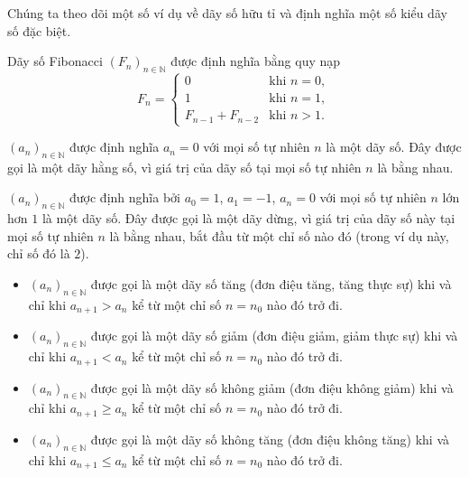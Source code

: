 Chúng ta theo dõi một số ví dụ về dãy số hữu tỉ và định nghĩa một số kiểu dãy số đặc biệt.
\begin{example}
    Dãy số Fibonacci ${(F_{n})}_{n\in\mathbb{N}}$ được định nghĩa bằng quy nạp
    \[
        F_{n} = \begin{cases}
            0                 & \text{khi $n = 0$}, \\
            1                 & \text{khi $n = 1$}, \\
            F_{n-1} + F_{n-2} & \text{khi $n > 1$}.
        \end{cases}
    \]
\end{example}

\begin{example}
    ${(a_{n})}_{n\in\mathbb{N}}$ được định nghĩa $a_{n} = 0$ với mọi số tự nhiên $n$ là một dãy số. Đây được gọi là một dãy hằng số, vì giá trị của dãy số tại mọi số tự nhiên $n$ là bằng nhau.
\end{example}

\begin{example}
    ${(a_{n})}_{n\in\mathbb{N}}$ được định nghĩa bởi $a_{0} = 1$, $a_{1} = -1$, $a_{n} = 0$ với mọi số tự nhiên $n$ lớn hơn $1$ là một dãy số. Đây được gọi là một dãy dừng, vì giá trị của dãy số này tại mọi số tự nhiên $n$ là bằng nhau, bắt đầu từ một chỉ số nào đó (trong ví dụ này, chỉ số đó là $2$).
\end{example}

\begin{example}
    \begin{itemize}
        \item ${(a_{n})}_{n\in\mathbb{N}}$ được gọi là một dãy số tăng (đơn điệu tăng, tăng thực sự) khi và chỉ khi $a_{n+1} > a_{n}$ kể từ một chỉ số $n = n_{0}$ nào đó trở đi.
        \item ${(a_{n})}_{n\in\mathbb{N}}$ được gọi là một dãy số giảm (đơn điệu giảm, giảm thực sự) khi và chỉ khi $a_{n+1} < a_{n}$ kể từ một chỉ số $n = n_{0}$ nào đó trở đi.
        \item ${(a_{n})}_{n\in\mathbb{N}}$ được gọi là một dãy số không giảm (đơn điệu không giảm) khi và chỉ khi $a_{n+1}\geq a_{n}$ kể từ một chỉ số $n = n_{0}$ nào đó trở đi.
        \item ${(a_{n})}_{n\in\mathbb{N}}$ được gọi là một dãy số không tăng (đơn điệu không tăng) khi và chỉ khi $a_{n+1}\leq a_{n}$ kể từ một chỉ số $n = n_{0}$ nào đó trở đi.
    \end{itemize}
\end{example}

